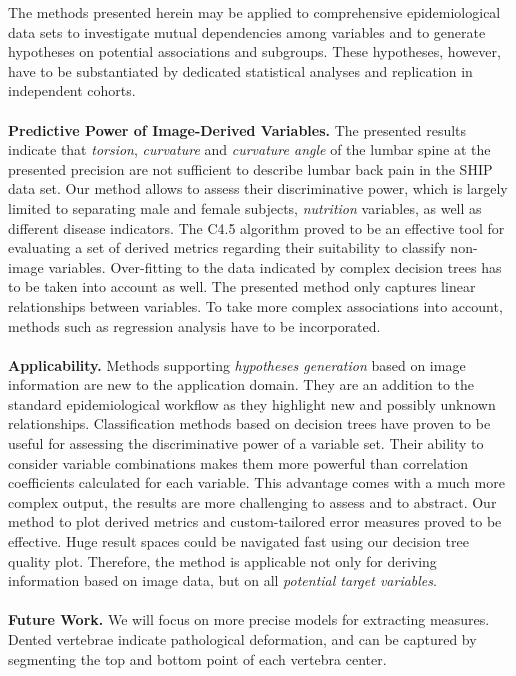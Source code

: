 \documentclass[a4paper,twoside]{style/article}
\begin{document}
The methods presented herein may be applied to comprehensive epidemiological data sets to investigate mutual dependencies among variables and to generate hypotheses on potential associations and subgroups.
These hypotheses, however, have to be substantiated by dedicated statistical analyses and replication in independent cohorts.
\\\\
\noindent \textbf{Predictive Power of Image-Derived Variables.}
The presented results indicate that \emph{torsion}, \emph{curvature} and \emph{curvature angle} of the lumbar spine at the presented precision are not sufficient to describe lumbar back pain in the SHIP data set.
Our method allows to assess their discriminative power, which is largely limited to separating male and female subjects, \emph{nutrition} variables, as well as different disease indicators.
The C4.5 algorithm proved to be an effective tool for evaluating a set of derived metrics regarding their suitability to classify non-image variables.
Over-fitting to the data indicated by complex decision trees has to be taken into account as well.
The presented method only captures linear relationships between variables.
To take more complex associations into account, methods such as regression analysis have to be incorporated.
\\\\
\noindent \textbf{Applicability.}
Methods supporting \emph{hypotheses generation} based on image information are new to the application domain.
They are an addition to the standard epidemiological workflow as they highlight new and possibly unknown relationships.
Classification methods based on decision trees have proven to be useful for assessing the discriminative power of a variable set.
Their ability to consider variable combinations makes them more powerful than correlation coefficients calculated for each variable.
This advantage comes with a much more complex output, the results are more challenging to assess and to abstract.
Our method to plot derived metrics and custom-tailored error measures proved to be effective.
Huge result spaces could be navigated fast using our decision tree quality plot.
Therefore, the method is applicable not only for deriving information based on image data, but on all \emph{potential target variables}.
\\\\
\noindent \textbf{Future Work.}
We will focus on more precise models for extracting measures.
Dented vertebrae indicate pathological deformation, and can be captured by segmenting the top and bottom point of each vertebra center.
\end{document}
